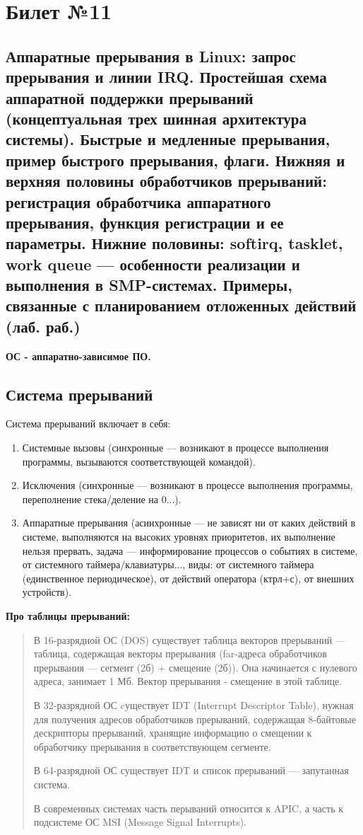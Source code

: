 \chapter{Билет №11}

\section*{Аппаратные прерывания в Linux: запрос прерывания и линии IRQ. Простейшая схема аппаратной поддержки прерываний (концептуальная трех шинная архитектура системы). Быстрые и медленные прерывания, пример быстрого прерывания, флаги. Нижняя и верхняя половины обработчиков прерываний: регистрация обработчика аппаратного прерывания, функция регистрации и ее параметры. Нижние половины: softirq, tasklet, work queue — особенности реализации и выполнения в SMP-системах. Примеры, связанные с планированием отложенных действий (лаб. раб.)}

\textbf{ОС - аппаратно-зависимое ПО.}

\section{Система прерываний}

Система прерываний включает в себя:
\begin{enumerate}
  \item Системные вызовы (синхронные --- возникают в процессе выполнения программы, вызываются соответствующей командой).
  \item Исключения (синхронные --- возникают в процессе выполнения программы, переполнение стека/деление на 0...).
  \item Аппаратные прерывания (асинхронные --- не зависят ни от каких действий в системе, выполняются на высоких уровнях приоритетов, их выполнение нельзя прервать, задача --- информирование процессов о событиях в системе, от системного таймера/клавиатуры..., виды: от системного таймера (единственное периодическое), от действий оператора (ктрл+с), от внешних устройств).
\end{enumerate}

\textbf{Про таблицы прерываний:}

\begin{quote}  
  В 16-разрядной ОС (DOS) существует таблица векторов прерываний --- таблица, содержащая векторы прерывания (far-адреса обработчиков прерывания --- сегмент (2б) + смещение (2б)). Она начинается с нулевого адреса, занимает 1 Мб. Вектор прерывания - смещение в этой таблице.
  
  В 32-разрядной ОС cуществует IDT (Interrupt Descriptor Table), нужная для получения адресов обработчиков прерываний, содержащая 8-байтовые дескрипторы прерываний, хранящие информацию о смещении к обработчику прерывания в соответствующем сегменте.
  
  В 64-разрядной ОС существует IDT и список прерываний --- запутанная система.
  
  В современных системах часть перываний относится к APIC, а часть к подсистеме ОС MSI (Message Signal Interrupts).
\end{quote}

